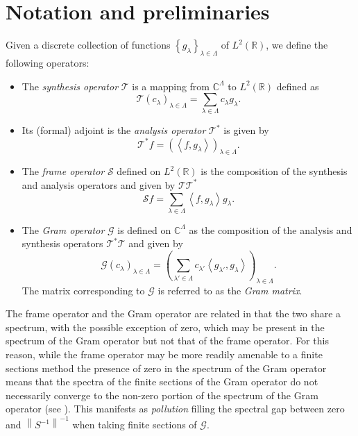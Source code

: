 \documentclass{article}
\newcommand{\R}{\mathbb{R}}
\newcommand{\C}{\mathbb{C}}
\newcommand{\set}[1]{\ensuremath{\left\{#1\right\}}}
\newcommand{\seq}[1]{\ensuremath{\left(#1\right)}}
\newcommand{\norm}[1]{\ensuremath{\left\lVert#1\right\rVert}}
\newcommand{\ip}[1]{\ensuremath{\left\langle#1\right\rangle}}
\begin{document}
\section{Notation and preliminaries}\label{sec:notations}


Given a discrete collection of functions 
\(\set{g_\lambda}_{\lambda \in \Lambda}\) of \(L^2(\R)\), we define the following operators: 
\begin{itemize}
	\item The \textit{synthesis operator} \(\mathscr{T}\) is a mapping from
	      \(\C^{\Lambda}\) to \(L^2(\R)\) defined as
		  \begin{equation}
			  \mathscr{T}\seq{c_{\lambda}}_{\lambda \in \Lambda} = \sum_{\lambda
			      \in \Lambda} c_{\lambda} g_{\lambda}.
		  \end{equation}
	\item Its (formal) adjoint is the \textit{analysis operator} \(\mathscr{T}^*\) is given by
		  \begin{equation}
		      \mathscr{T}^*f = \seq{\ip{f, g_{\lambda}}}_{\lambda \in \Lambda}.
		  \end{equation}
	\item The \textit{frame operator} \(\mathscr{S}\) defined on
	      \(L^2(\R)\) is the composition of the synthesis and
		  analysis operators and given by  \(\mathscr{T}\mathscr{T}^*\)
		  \begin{equation}
		      \mathscr{S}f = \sum_{\lambda \in \Lambda} \ip{f, g_{\lambda}}
			      g_{\lambda}.
		  \end{equation}
	\item The \textit{Gram operator} \(\mathscr{G}\) is defined on 
	      \(\C^{\Lambda}\) as the composition of the analysis and
		  synthesis operators  \(\mathscr{T}^*\mathscr{T}\) and given  by
		  \begin{equation}
			  \mathscr{G}\seq{c_{\lambda}}_{\lambda \in \Lambda} =
			      \seq{\sum_{\lambda' \in \Lambda} c_{\lambda'}
				  \ip{g_{\lambda'}, g_{\lambda}}}_{\lambda \in \Lambda}.
		  \end{equation}
		  The matrix corresponding to \(\mathscr{G}\) is
		  referred to as the \textit{Gram matrix}. 
\end{itemize}
The frame operator and the Gram operator are related in that the two
share a spectrum, with the possible exception of zero, which may be
present in the spectrum of the Gram operator but not that of the frame
operator. For this reason, while the frame operator may be more readily
amenable to a finite sections method the presence of zero in the
spectrum of the Gram operator means that the spectra of the finite sections of the Gram
operator do not necessarily converge to the non-zero portion of the spectrum of the Gram operator (see \cite{christensen2005finite}).
This manifests as \textit{pollution} filling the spectral gap between
zero and \(\norm{S^{-1}}^{-1}\) when taking finite sections of \(\mathscr{G}\).
\end{document}
